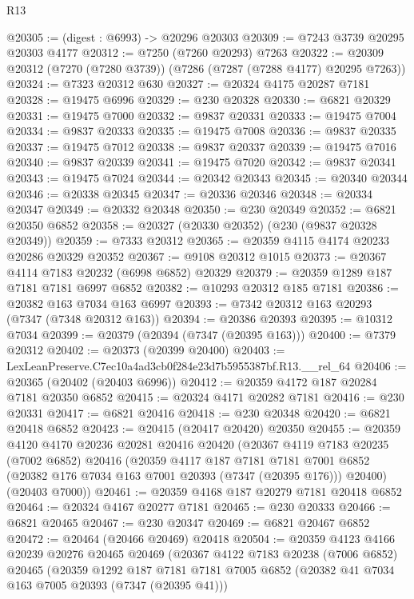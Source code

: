 \begin{lexlean}{R13}
\begin{coremodule}
@20305 := (digest : @6993) -> @20296 @20303
@20309 := @7243 @3739 @20295 @20303 @4177
@20312 := @7250 (@7260 @20293) @7263
@20322 := @20309 @20312 (@7270 (@7280 @3739)) (@7286 (@7287 (@7288 @4177) @20295 @7263))
@20324 := @7323 @20312 @630
@20327 := @20324 @4175 @20287 @7181
@20328 := @19475 @6996
@20329 := @230 @20328
@20330 := @6821 @20329
@20331 := @19475 @7000
@20332 := @9837 @20331
@20333 := @19475 @7004
@20334 := @9837 @20333
@20335 := @19475 @7008
@20336 := @9837 @20335
@20337 := @19475 @7012
@20338 := @9837 @20337
@20339 := @19475 @7016
@20340 := @9837 @20339
@20341 := @19475 @7020
@20342 := @9837 @20341
@20343 := @19475 @7024
@20344 := @20342 @20343
@20345 := @20340 @20344
@20346 := @20338 @20345
@20347 := @20336 @20346
@20348 := @20334 @20347
@20349 := @20332 @20348
@20350 := @230 @20349
@20352 := @6821 @20350 @6852
@20358 := @20327 (@20330 @20352) (@230 (@9837 @20328 @20349))
@20359 := @7333 @20312
@20365 := @20359 @4115 @4174 @20233 @20286 @20329 @20352
@20367 := @9108 @20312 @1015
@20373 := @20367 @4114 @7183 @20232 (@6998 @6852) @20329
@20379 := @20359 @1289 @187 @7181 @7181 @6997 @6852
@20382 := @10293 @20312 @185 @7181
@20386 := @20382 @163 @7034 @163 @6997
@20393 := @7342 @20312 @163 @20293 (@7347 (@7348 @20312 @163))
@20394 := @20386 @20393
@20395 := @10312 @7034
@20399 := @20379 (@20394 (@7347 (@20395 @163)))
@20400 := @7379 @20312
@20402 := @20373 (@20399 @20400)
@20403 := LexLeanPreserve.C7ec10a4ad3cb0f284e23d7b5955387bf.R13.__rel_64
@20406 := @20365 (@20402 (@20403 @6996))
@20412 := @20359 @4172 @187 @20284 @7181 @20350 @6852
@20415 := @20324 @4171 @20282 @7181
@20416 := @230 @20331
@20417 := @6821 @20416
@20418 := @230 @20348
@20420 := @6821 @20418 @6852
@20423 := @20415 (@20417 @20420) @20350
@20455 := @20359
    @4120
    @4170
    @20236
    @20281
    @20416
    @20420
    (@20367
      @4119
      @7183
      @20235
      (@7002 @6852)
      @20416
      (@20359
        @4117
        @187
        @7181
        @7181
        @7001
        @6852
        (@20382 @176 @7034 @163 @7001 @20393 (@7347 (@20395 @176)))
        @20400)
      (@20403 @7000))
@20461 := @20359 @4168 @187 @20279 @7181 @20418 @6852
@20464 := @20324 @4167 @20277 @7181
@20465 := @230 @20333
@20466 := @6821 @20465
@20467 := @230 @20347
@20469 := @6821 @20467 @6852
@20472 := @20464 (@20466 @20469) @20418
@20504 := @20359
    @4123
    @4166
    @20239
    @20276
    @20465
    @20469
    (@20367
      @4122
      @7183
      @20238
      (@7006 @6852)
      @20465
      (@20359
        @1292
        @187
        @7181
        @7181
        @7005
        @6852
        (@20382 @41 @7034 @163 @7005 @20393 (@7347 (@20395 @41)))

\end{coremodule}
\end{lexlean}
